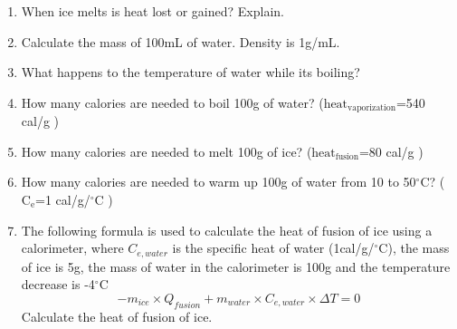 \documentclass[main.tex]{subfiles}
\begin{document}
\begin{enumerate}
\item When ice melts is heat lost or gained? Explain.
\vspace{2cm}

\item Calculate the mass of 100mL of water. Density is 1g/mL.
\vspace{2cm}

\item What happens to the temperature of water while its boiling?
\vspace{2cm}

\item How many calories are needed to boil 100g of water? ($\text{heat}_{\text{vaporization}}$=540 cal/g )
\vspace{2cm}


\item How many calories are needed to melt 100g of ice? ($\text{heat}_{\text{fusion}}$=80 cal/g )
\vspace{2cm}


\item How many calories are needed to warm up 100g of water from 10 to 50$^\circ$C? ($\text{C}_{\text{e}}$=1 cal/g/$^\circ$C )
\vspace{5cm}

\item The following formula is used to calculate the heat of fusion of ice using a calorimeter, where  $C_{e, water}$ is the specific heat of water (1cal/g/$^\circ$C), the mass of ice is 5g, the mass of water in the calorimeter is 100g and the temperature decrease is -4$^\circ$C
\begin{equation*}
-m_{ice}\times Q_{fusion}+m_{water}\times C_{e, water}\times \Delta T=0
\end{equation*}
Calculate the  heat of fusion of ice.

\vspace{2cm}



\end{enumerate}


\clearpage\mbox{}\clearpage
\end{document}
